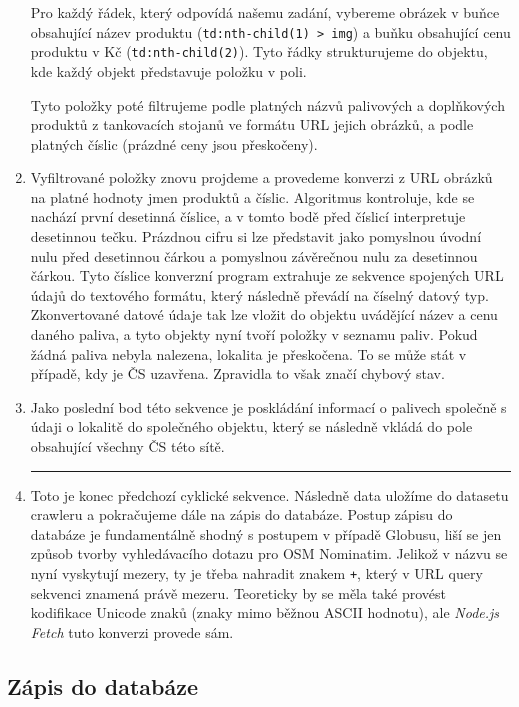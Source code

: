 \begin{enumerate}
        Pro každý řádek, který odpovídá našemu zadání, vybereme obrázek
        v buňce obsahující název produktu (\texttt{td:nth-child(1) > img})
        a buňku obsahující cenu produktu v Kč (\texttt{td:nth-child(2)}).
        Tyto řádky strukturujeme do objektu, kde každý objekt představuje
        položku v poli.

        Tyto položky poté filtrujeme podle platných názvů palivových
        a doplňkových produktů z tankovacích stojanů ve formátu URL jejich
        obrázků, a podle platných číslic (prázdné ceny jsou přeskočeny).
    \item Vyfiltrované položky znovu projdeme a provedeme konverzi
        z URL obrázků na platné hodnoty jmen produktů a číslic. Algoritmus
        kontroluje, kde se nachází první desetinná číslice, a v tomto bodě
        před číslicí interpretuje desetinnou tečku. Prázdnou cifru
        si lze představit jako pomyslnou úvodní nulu před desetinnou čárkou
        a pomyslnou závěrečnou nulu za desetinnou čárkou. Tyto číslice
        konverzní program extrahuje ze sekvence spojených URL údajů
        do textového formátu, který následně převádí na číselný datový typ.
        Zkonvertované datové údaje tak lze vložit do objektu uvádějící název
        a cenu daného paliva, a tyto objekty nyní tvoří položky v seznamu
        paliv. Pokud žádná paliva nebyla nalezena, lokalita je přeskočena.
        To se může stát v případě, kdy je ČS uzavřena. Zpravidla to však
        značí chybový stav.
    \item Jako poslední bod této sekvence je poskládání informací o palivech
        společně s údaji o lokalitě do společného objektu, který se následně
        vkládá do pole obsahující všechny ČS této sítě.
        \hrule
    \item Toto je konec předchozí cyklické sekvence. Následně data uložíme
        do datasetu crawleru a pokračujeme dále na zápis do databáze.
        Postup zápisu do databáze je fundamentálně shodný s postupem
        v případě Globusu, liší se jen způsob tvorby vyhledávacího dotazu
        pro OSM Nominatim. Jelikož v názvu se nyní vyskytují mezery,
        ty je třeba nahradit znakem \texttt{+}, který v URL query sekvenci
        znamená právě mezeru. Teoreticky by se měla také provést kodifikace
        Unicode znaků (znaky mimo běžnou ASCII hodnotu), ale \emph{Node.js
        Fetch} tuto konverzi provede sám.
\end{enumerate}

\subsection{Zápis do databáze}
\label{sec:writing-to-db}

